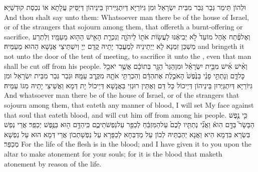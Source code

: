 {וּלְהוֹן תֵּימַר גְּבַר גְּבַר מִבֵּית יִשְׂרָאֵל וּמִן גִּיּוֹרַיָּא דְּיִתְגַּיְּירוּן בֵּינֵיהוֹן דְּיַסֵּיק עֲלָתָא אוֹ נִכְסַת קוּדְשַׁיָּא׃}
{And thou shalt say unto them: Whatsoever man there be of the house of Israel, or of the strangers that sojourn among them, that offereth a burnt-offering or sacrifice,}{}
{וְאֶל\maqqaf פֶּ֜תַח אֹ֤הֶל מוֹעֵד֙ לֹ֣א יְבִיאֶ֔נּוּ לַעֲשׂ֥וֹת אֹת֖וֹ לַיהֹוָ֑ה וְנִכְרַ֛ת הָאִ֥ישׁ הַה֖וּא מֵעַמָּֽיו׃}
{וְלִתְרַע מַשְׁכַּן זִמְנָא לָא יַיְתֵינֵיהּ לְמֶעֱבַד יָתֵיהּ קֳדָם יְיָ וְיִשְׁתֵּיצֵי אֲנָשָׁא הַהוּא מֵעַמֵּיהּ׃}
{and bringeth it not unto the door of the tent of meeting, to sacrifice it unto the \lord, even that man shall be cut off from his people.}{}
{וְאִ֨ישׁ אִ֜ישׁ מִבֵּ֣ית יִשְׂרָאֵ֗ל וּמִן\maqqaf הַגֵּר֙ הַגָּ֣ר בְּתוֹכָ֔ם אֲשֶׁ֥ר יֹאכַ֖ל כׇּל\maqqaf דָּ֑ם וְנָתַתִּ֣י פָנַ֗י בַּנֶּ֙פֶשׁ֙ הָאֹכֶ֣לֶת אֶת\maqqaf הַדָּ֔ם וְהִכְרַתִּ֥י אֹתָ֖הּ מִקֶּ֥רֶב עַמָּֽהּ׃}
{וּגְבַר גְּבַר מִבֵּית יִשְׂרָאֵל וּמִן גִּיּוֹרַיָּא דְּיִתְגַּיְּרוּן בֵּינֵיהוֹן דְּיֵיכוֹל כָּל דַּם וְאֶתֵּין רוּגְזִי בַּאֲנָשָׁא דְּיֵיכוֹל יָת דְּמָא וַאֲשֵׁיצֵי יָתֵיהּ מִגּוֹ עַמֵּיהּ׃}
{And whatsoever man there be of the house of Israel, or of the strangers that sojourn among them, that eateth any manner of blood, I will set My face against that soul that eateth blood, and will cut him off from among his people.}{}
{כִּ֣י נֶ֣פֶשׁ הַבָּשָׂר֮ בַּדָּ֣ם הִוא֒ וַאֲנִ֞י נְתַתִּ֤יו לָכֶם֙ עַל\maqqaf הַמִּזְבֵּ֔חַ לְכַפֵּ֖ר עַל\maqqaf נַפְשֹׁתֵיכֶ֑ם כִּֽי\maqqaf הַדָּ֥ם ה֖וּא בַּנֶּ֥פֶשׁ יְכַפֵּֽר׃}
{אֲרֵי נְפַשׁ בִּשְׂרָא בִּדְמָא הִיא וַאֲנָא יְהַבְתֵּיהּ לְכוֹן עַל מַדְבְּחָא לְכַפָּרָא עַל נַפְשָׁתְכוֹן אֲרֵי דְּמָא הוּא עַל נַפְשָׁא מְכַפַּר׃}
{For the life of the flesh is in the blood; and I have given it to you upon the altar to make atonement for your souls; for it is the blood that maketh atonement by reason of the life.}{}
